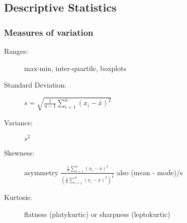 \subsection{Descriptive Statistics}
\subsubsection{Measures of variation}
\begin{description}
	\item[Ranges:] max-min, inter-quartile, boxplots
	\item[Standard Deviation:] $s=\sqrt{\frac{1}{n-1}\sum^n_{i=1}\left(x_i - \bar{x}\right)^2}$
	\item[Variance:] $s^2$
	\item[Skewness:] asymmetry $\frac{
	\frac{1}{n}\sum^n_{i=1}\left(x_i-\bar{x}\right)^3
	}{
	\left(
		\frac{1}{n}\sum^n_{i=1}\left(x_i-\bar{x}\right)^2
	\right)^\frac{3}{2}
	}$ also (mean - mode)/s
	\item[Kurtosis:] flatness (platykurtic) or sharpness (leptokurtic)
\end{description}
